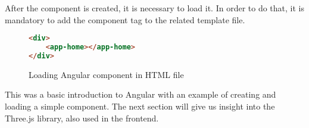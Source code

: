 After the component is created, it is necessary to load it. In order to do that, it is mandatory to add the component tag to the related template
file.

\begin{figure}[hbt!]
    \begin{center}
        \begin{lstlisting}[language=HTML,label={lst:angular-code-2},belowskip=-1 \baselineskip]
<div>
    <app-home></app-home>
</div>
        \end{lstlisting}
    \end{center}
    \caption{Loading Angular component in HTML file}
    \label{fig:figure4.2}
\end{figure}

This was a basic introduction to Angular with an example of creating and loading a simple component. The next section will give us
insight into the Three.js library, also used in the frontend.